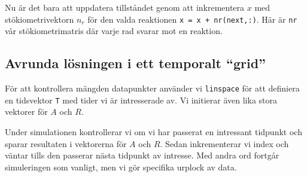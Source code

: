 Nu är det bara att uppdatera tillståndet genom att inkrementera $x$ med stökiometrivektorn $n_r$ för den valda reaktionen \lstinline|x = x + nr(next,:)|. Här är \lstinline|nr| vår stökiometrimatris där varje rad svarar mot en reaktion.

\subsection{Avrunda lösningen i ett temporalt ``grid''}

För att kontrollera mängden datapunkter använder vi \lstinline|linspace| för att definiera en tidsvektor \lstinline|T| med tider vi är intresserade av. Vi initierar även lika stora vektorer för $A$ och $R$.

Under simulationen kontrollerar vi om vi har passerat en intressant tidpunkt och sparar resultaten i vektorerna för $A$ och $R$. Sedan inkrementerar vi index och väntar tills den passerar nästa tidpunkt av intresse. Med andra ord fortgår simuleringen som vanligt, men vi gör specifika urplock av data.

